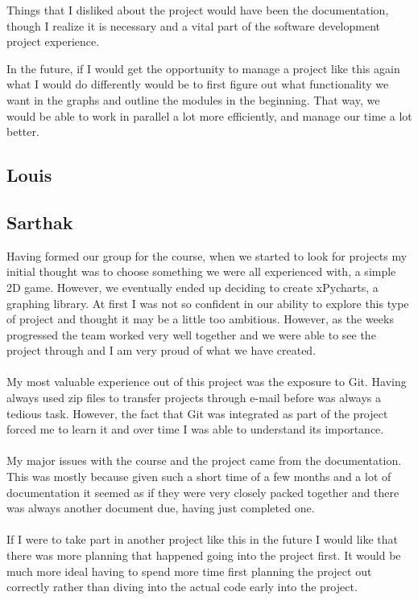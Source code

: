 \documentclass{article}
\begin{document}
Things that I disliked about the project would have been the documentation, though I realize it is necessary and a vital part of the software development project experience. 

In the future, if I would get the opportunity to manage a project like this again what I would do differently would be to first figure out what functionality we want in the graphs and outline the modules in the beginning. That way, we would be able to work in parallel a lot more efficiently, and manage our time a lot better. 
\subsection{Louis}
\subsection{Sarthak}
Having formed our group for the course, when we started to look for projects my initial thought was to choose something we were all experienced with, a simple 2D game. However, we eventually ended up deciding to create xPycharts, a graphing library. At first I was not so confident in our ability to explore this type of project and thought it may be a little too ambitious. However, as the weeks progressed the team worked very well together and we were able to see the project through and I am very proud of what we have created.\\\\
My most valuable experience out of this project was the exposure to Git. Having always used zip files to transfer projects through e-mail before was always a tedious task. However, the fact that Git was integrated as part of the project forced me to learn it and over time I was able to understand its importance.\\\\
My major issues with the course and the project came from the documentation. This was mostly because given such a short time of a few months and a lot of documentation it seemed as if they were very closely packed together and there was always another document due, having just completed one.\\\\
If I were to take part in another project like this in the future I would like that there was more planning that happened going into the project first. It would be much more ideal having to spend more time first planning the project out correctly rather than diving into the actual code early into the project.
\end{document}
